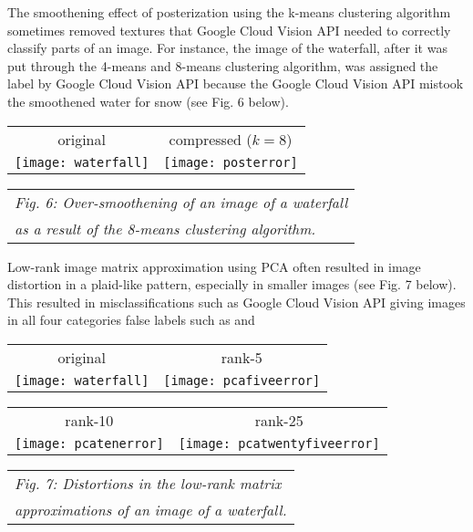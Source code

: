 \documentclass[letterpaper, 10 pt, conference]{ieeeconf}  %
\begin{document}
The smoothening effect of posterization using the k-means clustering
algorithm sometimes removed textures that Google Cloud Vision API
needed to correctly classify parts of an image. For instance,
the image of the waterfall, after it was put through the
4-means and 8-means clustering algorithm, was assigned the label 
by Google Cloud Vision API because the Google Cloud Vision API mistook
the smoothened water for snow (see Fig. 6 below).

\vspace*{3mm}
\begin{tabular}{c c}
	original & compressed ($k=8$) \\
	\texttt{[image: waterfall]} &
		\texttt{[image: posterror]} \\
\end{tabular}
\begin{tabular}{l}
	\hspace*{4mm} {\it Fig. 6: Over-smoothening of an image of a waterfall} \\
	\hspace*{4mm} {\it as a result of the 8-means clustering algorithm.} \\
\end{tabular}
\vspace*{3mm}

Low-rank image matrix approximation using PCA often resulted in
image distortion in a plaid-like pattern, especially in smaller
images (see Fig. 7 below). This resulted in misclassifications
such as Google Cloud Vision API giving images in all four categories
false labels such as  
and 

\vspace*{3mm}
\begin{tabular}{c c}
	original & rank-5 \\
	\texttt{[image: waterfall]} &
		\texttt{[image: pcafiveerror]} \\
\end{tabular}

\begin{tabular}{c c}
	rank-10 & rank-25 \\
	\texttt{[image: pcatenerror]} &
		\texttt{[image: pcatwentyfiveerror]} \\
\end{tabular}
\begin{tabular}{l}
	\hspace*{4mm} {\it Fig. 7: Distortions in the low-rank matrix } \\
	\hspace*{4mm} {\it approximations of an image of a waterfall.} \\
\end{tabular}
\vspace*{3mm}
\end{document}
